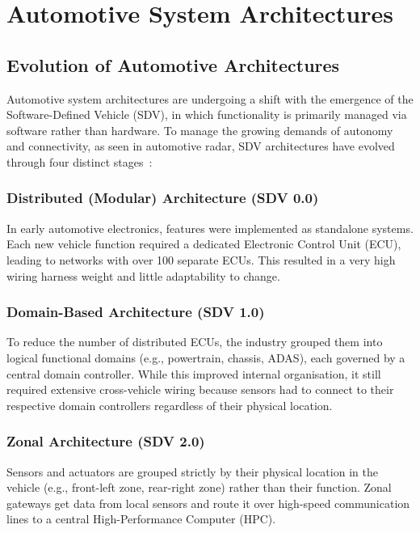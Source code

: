 \section{Automotive System Architectures}
\label{sec:sdv}

\subsection{Evolution of Automotive Architectures}

Automotive system architectures are undergoing a shift with the emergence of the Software-Defined Vehicle (SDV), in which functionality is primarily managed via software rather than hardware. To manage the growing demands of autonomy and connectivity, as seen in automotive radar, SDV architectures have evolved through four distinct stages~\cite{khamis2025}:

\subsubsection{Distributed (Modular) Architecture (SDV 0.0)} In early automotive electronics, features were implemented as standalone systems. Each new vehicle function required a dedicated Electronic Control Unit (ECU), leading to networks with over 100 separate ECUs. This resulted in a very high wiring harness weight and little adaptability to change.

\subsubsection{Domain-Based Architecture (SDV 1.0)} To reduce the number of distributed ECUs, the industry grouped them into logical functional domains (e.g., powertrain, chassis, ADAS), each governed by a central domain controller. While this improved internal organisation, it still required extensive cross-vehicle wiring because sensors had to connect to their respective domain controllers regardless of their physical location.

\subsubsection{Zonal Architecture (SDV 2.0)} Sensors and actuators are grouped strictly by their physical location in the vehicle (e.g., front-left zone, rear-right zone) rather than their function. Zonal gateways get data from local sensors and route it over high-speed communication lines to a central High-Performance Computer (HPC).

